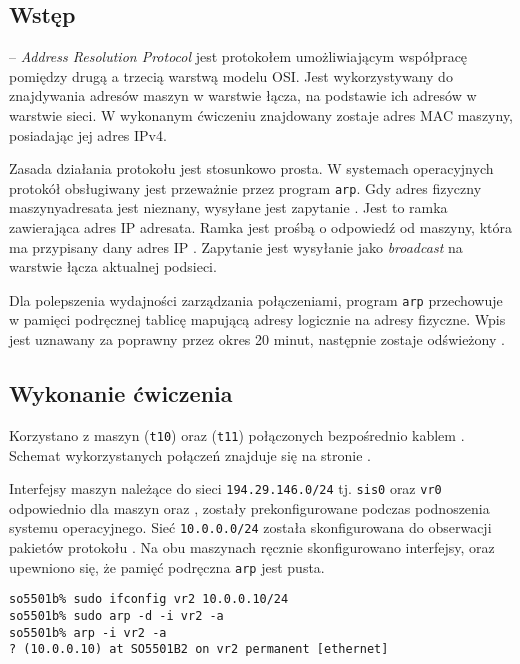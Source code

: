 \subsection{Wstęp}

\arp{} -- \emph{Address Resolution Protocol} jest protokołem umożliwiającym
współpracę pomiędzy drugą a trzecią warstwą modelu OSI. Jest wykorzystywany do
znajdywania adresów maszyn w warstwie łącza, na podstawie ich adresów w warstwie
sieci. W wykonanym ćwiczeniu znajdowany zostaje adres MAC maszyny, posiadając
jej adres IPv4.

Zasada działania protokołu \arp{} jest stosunkowo prosta. W systemach
operacyjnych protokół obsługiwany jest przeważnie przez program \texttt{arp}.
Gdy adres fizyczny maszyny\dywiz adresata jest nieznany, wysyłane jest zapytanie
\arp. Jest to ramka \eth{} zawierająca adres IP adresata. Ramka jest prośbą o
odpowiedź od maszyny, która ma przypisany dany adres IP
\cite{arp:stevens_arp_przyklad}. Zapytanie jest wysyłanie jako \emph{broadcast}
na warstwie łącza aktualnej podsieci.

Dla polepszenia wydajności zarządzania połączeniami, program \texttt{arp}
przechowuje w pamięci podręcznej tablicę mapującą adresy logicznie na adresy
fizyczne. Wpis jest uznawany za poprawny przez okres 20 minut, następnie zostaje
odświeżony \cite{arp:stevens_arp_cache}.

\subsection{Wykonanie ćwiczenia}

Korzystano z maszyn \tjz{} (\texttt{t10}) oraz \tjj{} (\texttt{t11})
połączonych bezpośrednio kablem \eth. Schemat wykorzystanych połączeń znajduje
się na stronie \pageref{fig:arp_schemat}.

Interfejsy maszyn należące do sieci \texttt{194.29.146.0/24} tj. \texttt{sis0}
oraz \texttt{vr0} odpowiednio dla maszyn \tjz{} oraz \tjj, zostały
prekonfigurowane podczas podnoszenia systemu operacyjnego. Sieć
\texttt{10.0.0.0/24} została skonfigurowana do obserwacji pakietów protokołu
\arp. Na obu maszynach ręcznie skonfigurowano interfejsy, oraz upewniono się, że
pamięć podręczna \texttt{arp} jest pusta.

\begin{lstlisting}
so5501b% sudo ifconfig vr2 10.0.0.10/24
so5501b% sudo arp -d -i vr2 -a
so5501b% arp -i vr2 -a
? (10.0.0.10) at SO5501B2 on vr2 permanent [ethernet]
\end{lstlisting}

